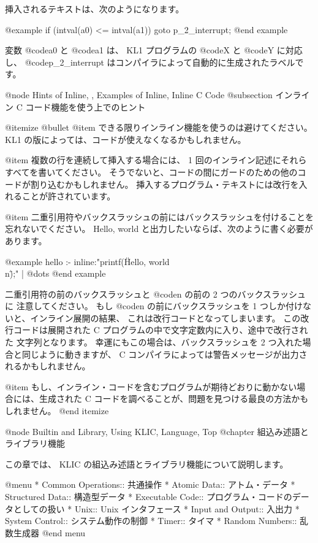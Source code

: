 {挿入されるテキストは、次のようになります。

@example
if (intval(a0) <= intval(a1)) goto p_2_interrupt;
@end example

変数 @code{a0} と @code{a1} は、 KL1 プログラムの @code{X} と @code{Y} に対応し、 @code{p_2_interrupt} はコンパイラによって自動的に生成されたラベルです。

@node Hints of Inline,  , Examples of Inline, Inline C Code
@subsection インライン C コード機能を使う上でのヒント

@itemize @bullet
@item
できる限りインライン機能を使うのは避けてください。 
KL1 の版によっては、コードが使えなくなるかもしれません。

@item 
複数の行を連続して挿入する場合には、 1 回のインライン記述にそれらすべてを書いてください。
そうでないと、コードの間にガードのための他のコードが割り込むかもしれません。
挿入するプログラム・テキストには改行を入れることが許されています。

@item 
二重引用符やバックスラッシュの前にはバックスラッシュを付けることを忘れないでください。
Hello, world と出力したいならば、次のように書く必要があります。

@example
hello :-
    inline:"printf(\"Hello, world\\n\");" |
    @dots{}
@end example

二重引用符の前のバックスラッシュと @code{n} の前の 2 つのバックスラッシュに
注意してください。
もし @code{n} の前にバックスラッシュを 1 つしか付けないと、インライン展開の結果、
これは改行コードとなってしまいます。
この改行コードは展開された C プログラムの中で文字定数内に入り、途中で改行された
文字列となります。
幸運にもこの場合は、バックスラッシュを 2 つ入れた場合と同じように動きますが、 C コンパイラによっては警告メッセージが出力されるかもしれません。

@item 
もし、インライン・コードを含むプログラムが期待どおりに動かない場合には、生成された C コードを調べることが、問題を見つける最良の方法かもしれません。
@end itemize


@node Builtin and Library, Using KLIC, Language, Top
@chapter 組込み述語とライブラリ機能

この章では、 KLIC の組込み述語とライブラリ機能について説明します。

@menu
* Common Operations::           共通操作
* Atomic Data::                 アトム・データ
* Structured Data::             構造型データ
* Executable Code::             プログラム・コードのデータとしての扱い
* Unix::                        Unix インタフェース
* Input and Output::            入出力
* System Control::              システム動作の制御
* Timer::                       タイマ
* Random Numbers::              乱数生成器
@end menu

}
